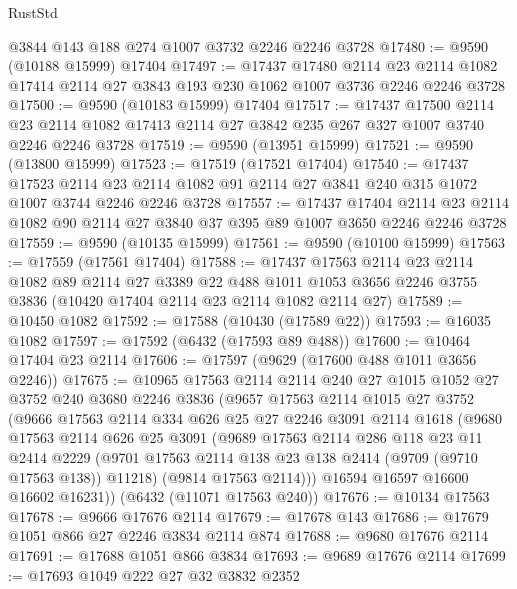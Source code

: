 \begin{lexlean}{RustStd}
\begin{coremodule}
    @3844
    @143
    @188
    @274
    @1007
    @3732
    @2246
    @2246
    @3728
@17480 := @9590 (@10188 @15999) @17404
@17497 := @17437
    @17480
    @2114
    @23
    @2114
    @1082
    @17414
    @2114
    @27
    @3843
    @193
    @230
    @1062
    @1007
    @3736
    @2246
    @2246
    @3728
@17500 := @9590 (@10183 @15999) @17404
@17517 := @17437
    @17500
    @2114
    @23
    @2114
    @1082
    @17413
    @2114
    @27
    @3842
    @235
    @267
    @327
    @1007
    @3740
    @2246
    @2246
    @3728
@17519 := @9590 (@13951 @15999)
@17521 := @9590 (@13800 @15999)
@17523 := @17519 (@17521 @17404)
@17540 := @17437
    @17523
    @2114
    @23
    @2114
    @1082
    @91
    @2114
    @27
    @3841
    @240
    @315
    @1072
    @1007
    @3744
    @2246
    @2246
    @3728
@17557 := @17437
    @17404
    @2114
    @23
    @2114
    @1082
    @90
    @2114
    @27
    @3840
    @37
    @395
    @89
    @1007
    @3650
    @2246
    @2246
    @3728
@17559 := @9590 (@10135 @15999)
@17561 := @9590 (@10100 @15999)
@17563 := @17559 (@17561 @17404)
@17588 := @17437
    @17563
    @2114
    @23
    @2114
    @1082
    @89
    @2114
    @27
    @3389
    @22
    @488
    @1011
    @1053
    @3656
    @2246
    @3755
    @3836
    (@10420 @17404 @2114 @23 @2114 @1082 @2114 @27)
@17589 := @10450 @1082
@17592 := @17588 (@10430 (@17589 @22))
@17593 := @16035 @1082
@17597 := @17592 (@6432 (@17593 @89 @488))
@17600 := @10464 @17404 @23 @2114
@17606 := @17597 (@9629 (@17600 @488 @1011 @3656 @2246))
@17675 := @10965
    @17563
    @2114
    @2114
    @240
    @27
    @1015
    @1052
    @27
    @3752
    @240
    @3680
    @2246
    @3836
    (@9657
      @17563
      @2114
      @1015
      @27
      @3752
      (@9666
        @17563
        @2114
        @334
        @626
        @25
        @27
        @2246
        @3091
        @2114
        @1618
        (@9680
          @17563
          @2114
          @626
          @25
          @3091
          (@9689
            @17563
            @2114
            @286
            @118
            @23
            @11
            @2414
            @2229
            (@9701 @17563 @2114 @138 @23 @138 @2414 (@9709 (@9710 @17563 @138)) @11218)
            (@9814 @17563 @2114)))
        @16594
        @16597
        @16600
        @16602
        @16231))
    (@6432 (@11071 @17563 @240))
@17676 := @10134 @17563
@17678 := @9666 @17676 @2114
@17679 := @17678 @143
@17686 := @17679 @1051 @866 @27 @2246 @3834 @2114 @874
@17688 := @9680 @17676 @2114
@17691 := @17688 @1051 @866 @3834
@17693 := @9689 @17676 @2114
@17699 := @17693 @1049 @222 @27 @32 @3832 @2352

\end{coremodule}
\end{lexlean}
